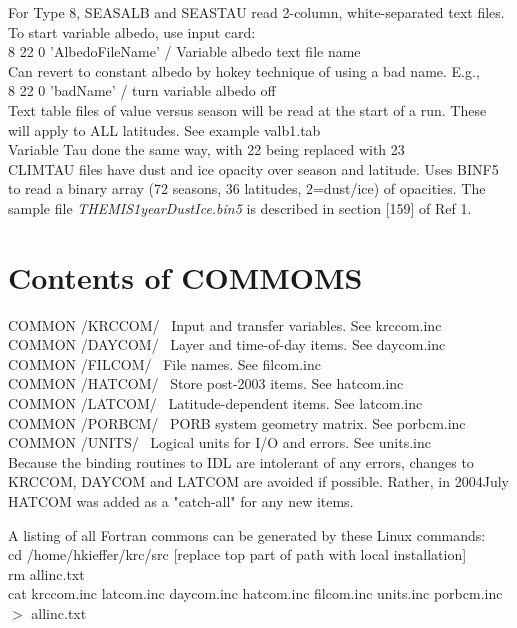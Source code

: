 \documentclass[draft]{article}  %
\newcommand{\qi}{\\ \hspace*{2.em}}      %
\newcommand{\nf}{\textit}  %
\begin{document}
For Type 8, SEASALB and SEASTAU read 2-column, white-separated text files. \\
To start variable albedo, use input card: 
\qi  8 22 0 'AlbedoFileName' / Variable albedo text file name \\
Can revert to constant albedo by hokey technique of using a bad name. E.g.,
\qi  8 22 0 'badName' / turn variable albedo off \\
Text table files of value versus season will be read at the start of a
run. These will apply to ALL latitudes. See example  valb1.tab   \\
Variable Tau done the same way, with 22 being replaced with 23 \\

CLIMTAU files have dust and ice opacity over season and latitude. Uses BINF5 to
read a binary array (72 seasons, 36 latitudes, 2=dust/ice) of opacities. The
sample file \nf{THEMIS1yearDustIce.bin5} is described in section [159] of Ref 1.
 
\section{Contents of COMMOMS } %
 COMMON /KRCCOM/ \ Input and transfer variables. See krccom.inc  
\\ COMMON /DAYCOM/ \ Layer and time-of-day items. See daycom.inc  
\\ COMMON /FILCOM/ \ File names. See filcom.inc  
\\ COMMON /HATCOM/ \ Store post-2003 items. See hatcom.inc  
\\ COMMON /LATCOM/ \ Latitude-dependent items. See latcom.inc  
\\ COMMON /PORBCM/ \ PORB system geometry matrix.  See porbcm.inc  
\\ COMMON /UNITS/ \ Logical units for I/O and errors.  See units.inc  \\


Because the binding routines to IDL are intolerant of any errors, changes to
KRCCOM, DAYCOM and LATCOM are avoided if possible. Rather, in 2004July HATCOM
was added as a "catch-all" for any new items.

A listing of all Fortran commons can be generated by these Linux commands: \\ 
cd /home/hkieffer/krc/src [replace top part of path with local installation] \\ 
rm allinc.txt \\ 
cat krccom.inc latcom.inc daycom.inc hatcom.inc filcom.inc units.inc porbcm.inc $>$ allinc.txt 
              
\end{document}
